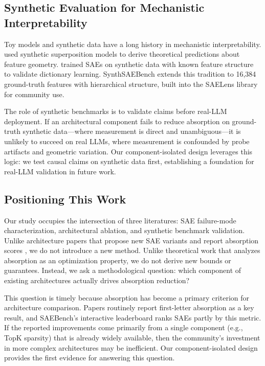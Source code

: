 \documentclass{article}
\begin{document}
\subsection{Synthetic Evaluation for Mechanistic Interpretability}

Toy models and synthetic data have a long history in mechanistic interpretability. \citet{elhage2022superposition} used synthetic superposition models to derive theoretical predictions about feature geometry. \citet{lieberum2023saelens} trained SAEs on synthetic data with known feature structure to validate dictionary learning. SynthSAEBench \citep{chanin2026synthsaebench} extends this tradition to 16,384 ground-truth features with hierarchical structure, built into the SAELens library for community use.

The role of synthetic benchmarks is to validate claims before real-LLM deployment. If an architectural component fails to reduce absorption on ground-truth synthetic data---where measurement is direct and unambiguous---it is unlikely to succeed on real LLMs, where measurement is confounded by probe artifacts and geometric variation. Our component-isolated design leverages this logic: we test causal claims on synthetic data first, establishing a foundation for real-LLM validation in future work.

\subsection{Positioning This Work}

Our study occupies the intersection of three literatures: SAE failure-mode characterization, architectural ablation, and synthetic benchmark validation. Unlike architecture papers that propose new SAE variants and report absorption scores \citep{bussmann2025matryoshka,korznikov2025ortsae}, we do not introduce a new method. Unlike theoretical work that analyzes absorption as an optimization property, we do not derive new bounds or guarantees. Instead, we ask a methodological question: which component of existing architectures actually drives absorption reduction?

This question is timely because absorption has become a primary criterion for architecture comparison. Papers routinely report first-letter absorption as a key result, and SAEBench's interactive leaderboard ranks SAEs partly by this metric. If the reported improvements come primarily from a single component (e.g., TopK sparsity) that is already widely available, then the community's investment in more complex architectures may be inefficient. Our component-isolated design provides the first evidence for answering this question.
\end{document}
